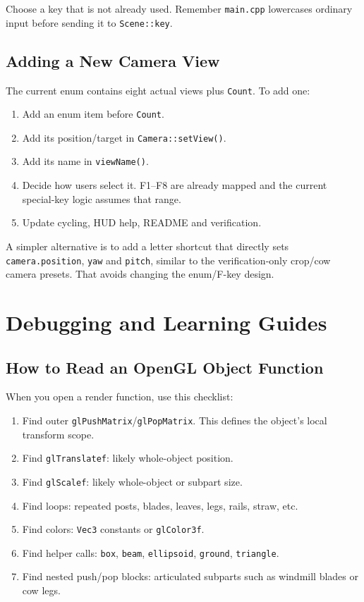 \documentclass[11pt,a4paper,openany]{book}
\newcommand{\code}[1]{\texttt{#1}}
\begin{document}
\begin{warningbox}
	Choose a key that is not already used. Remember \code{main.cpp} lowercases ordinary input before sending it to \code{Scene::key}.
\end{warningbox}

\chapter{Adding a New Camera View}
The current enum contains eight actual views plus \code{Count}. To add one:
\begin{enumerate}
	\item Add an enum item before \code{Count}.
	\item Add its position/target in \code{Camera::setView()}.
	\item Add its name in \code{viewName()}.
	\item Decide how users select it. F1--F8 are already mapped and the current special-key logic assumes that range.
	\item Update cycling, HUD help, README and verification.
\end{enumerate}

\begin{beginnerbox}
	A simpler alternative is to add a letter shortcut that directly sets \code{camera.position}, \code{yaw} and \code{pitch}, similar to the verification-only crop/cow camera presets. That avoids changing the enum/F-key design.
\end{beginnerbox}

\part{Debugging and Learning Guides}

\chapter{How to Read an OpenGL Object Function}
When you open a render function, use this checklist:
\begin{enumerate}
	\item Find outer \code{glPushMatrix}/\code{glPopMatrix}. This defines the object's local transform scope.
	\item Find \code{glTranslatef}: likely whole-object position.
	\item Find \code{glScalef}: likely whole-object or subpart size.
	\item Find loops: repeated posts, blades, leaves, legs, rails, straw, etc.
	\item Find colors: \code{Vec3} constants or \code{glColor3f}.
	\item Find helper calls: \code{box}, \code{beam}, \code{ellipsoid}, \code{ground}, \code{triangle}.
	\item Find nested push/pop blocks: articulated subparts such as windmill blades or cow legs.
\end{enumerate}
\end{document}
